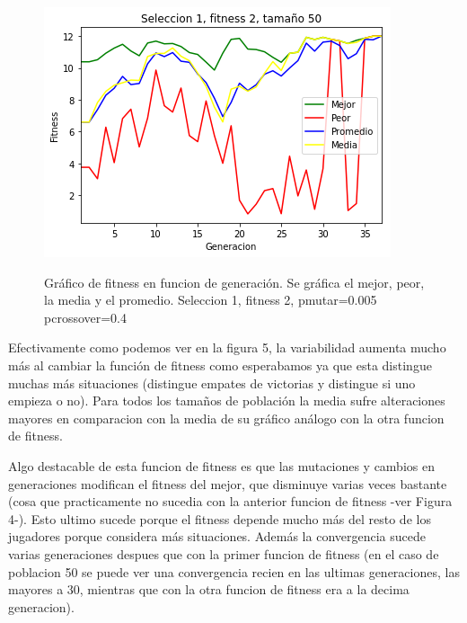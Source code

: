 \documentclass[A4paper,oneside,fleqn,11pt]{article}
\theoremstyle{definition}
\begin{document}
\begin{figure}[H]
	\captionsetup[subfigure]{position=b}
	\centering
		{\includegraphics[width=0.3\linewidth]{s1f2t50.png}}
	\caption{Gráfico de fitness en funcion de generación. Se gráfica el mejor, peor, la media y el promedio. Seleccion 1, fitness 2, pmutar=0.005 pcrossover=0.4}
\end{figure}

Efectivamente como podemos ver en la figura 5, la variabilidad aumenta mucho más al cambiar la función de fitness como esperabamos ya que esta distingue muchas más situaciones (distingue empates de victorias y distingue si uno empieza o no). Para todos los tamaños de población la media sufre alteraciones mayores en comparacion con la media de su gráfico análogo con la otra funcion de fitness.

Algo destacable de esta funcion de fitness es que las mutaciones y cambios en generaciones modifican el fitness del mejor, que disminuye varias veces bastante (cosa que practicamente no sucedia con la anterior funcion de fitness -ver Figura 4-). Esto ultimo sucede porque el fitness depende mucho más del resto de los jugadores porque considera más situaciones. Además la convergencia sucede varias generaciones despues que con la primer funcion de fitness (en el caso de poblacion 50 se puede ver una convergencia recien en las ultimas generaciones, las mayores a 30, mientras que con la otra funcion de fitness era a la decima generacion). 
\end{document}
